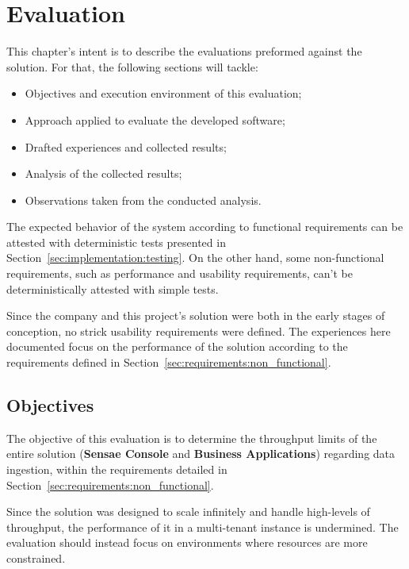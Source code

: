 \chapter{Evaluation}
\label{chap:evaluation}

This chapter's intent is to describe the evaluations preformed against the solution. For that, the following sections will tackle:

\begin{itemize}
    \item Objectives and execution environment of this evaluation;
    \item Approach applied to evaluate the developed software;
    \item Drafted experiences and collected results;
    \item Analysis of the collected results;
    \item Observations taken from the conducted analysis.
\end{itemize}

The expected behavior of the system according to functional requirements can be attested with deterministic tests presented in Section~\ref{sec:implementation:testing}. On the other hand, some non-functional requirements, such as performance and usability requirements, can't be deterministically attested with simple tests.

Since the company and this project's solution were both in the early stages of conception, no strick usability requirements were defined. The experiences here documented focus on the performance of the solution according to the requirements defined in Section~\ref{sec:requirements:non_functional}.

\section{Objectives}
\label{sec:evaluation:objectives}

The objective of this evaluation is to determine the throughput limits of the entire solution (\textbf{Sensae Console} and \textbf{Business Applications}) regarding data ingestion, within the requirements detailed in Section~\ref{sec:requirements:non_functional}.

Since the solution was designed to scale infinitely and handle high-levels of throughput, the performance of it in a multi-tenant instance is undermined. The evaluation should instead focus on environments where resources are more constrained.

